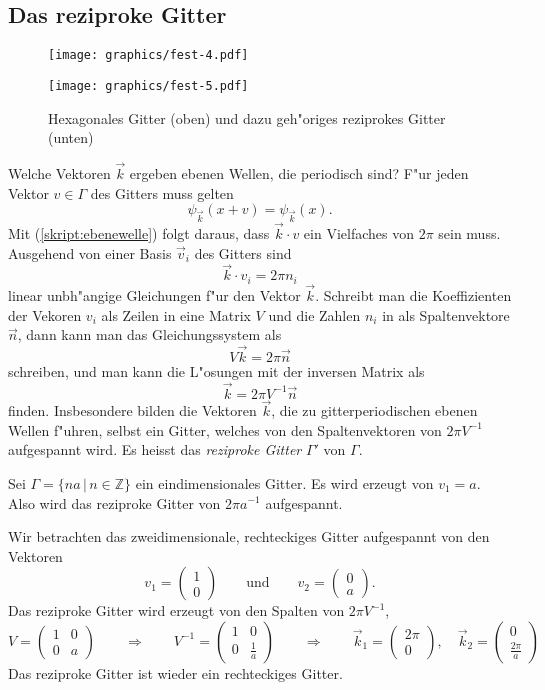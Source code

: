 \subsection{Das reziproke Gitter}
\begin{figure}
\centering
\texttt{[image: graphics/fest-4.pdf]}
\bigskip

\texttt{[image: graphics/fest-5.pdf]}
\caption{Hexagonales Gitter (oben) und dazu geh"origes reziprokes Gitter
(unten)
\label{skript:hexagonalesgitter}}
\end{figure}
Welche Vektoren $\vec k$ ergeben ebenen Wellen, die periodisch sind?
F"ur jeden Vektor $v\in\Gamma$ des Gitters muss gelten
\[
\psi_{\vec k}(x+v)=\psi_{\vec k}(x).
\]
Mit (\ref{skript:ebenewelle}) folgt daraus, dass
$\vec k\cdot v$ ein Vielfaches von $2\pi$ sein muss.
Ausgehend von einer Basis $\vec v_i$ des Gitters sind
\[
\vec k\cdot v_i=2\pi n_i
\]
linear unbh"angige Gleichungen f"ur den Vektor $\vec k$. Schreibt man
die Koeffizienten der Vekoren $v_i$ als Zeilen in eine Matrix $V$
und die Zahlen $n_i$ in als Spaltenvektore $\vec n$,
dann kann man das Gleichungssystem als
\[
V\vec k=2\pi\vec n
\]
schreiben, und man kann die L"osungen mit der inversen Matrix als
\[
\vec k = 2\pi V^{-1}\vec n
\]
finden.
Insbesondere bilden die Vektoren $\vec k$, die zu gitterperiodischen
ebenen Wellen f"uhren, selbst ein Gitter, welches von den Spaltenvektoren
von $2\pi V^{-1}$ aufgespannt wird.
Es heisst das {\em reziproke Gitter} $\Gamma'$ von $\Gamma$.
%

\begin{beispiel}
Sei $\Gamma = \{ na\,|\, n\in\mathbb Z\}$ ein eindimensionales Gitter.
Es wird erzeugt von $v_1=a$.
Also wird das reziproke Gitter von $2\pi a^{-1}$ aufgespannt.
\end{beispiel}

\begin{beispiel}
Wir betrachten das zweidimensionale, rechteckiges Gitter
aufgespannt von den Vektoren
\[
v_1=\begin{pmatrix}1\\0\end{pmatrix}
\qquad\text{und}\qquad
v_2=\begin{pmatrix}0\\a\end{pmatrix}.
\]
Das reziproke Gitter wird erzeugt von den Spalten von $2\pi V^{-1}$,
\[
V=\begin{pmatrix} 1&0\\ 0&a \end{pmatrix}
\qquad\Rightarrow\qquad
V^{-1}=\begin{pmatrix}1&0\\0&\frac1a\end{pmatrix}
\qquad\Rightarrow\qquad
\vec k_1=\begin{pmatrix}2\pi\\0\end{pmatrix},\quad
\vec k_2=\begin{pmatrix}0\\\frac{2\pi}a\end{pmatrix}
\]
Das reziproke Gitter ist wieder ein rechteckiges Gitter.
\end{beispiel}

